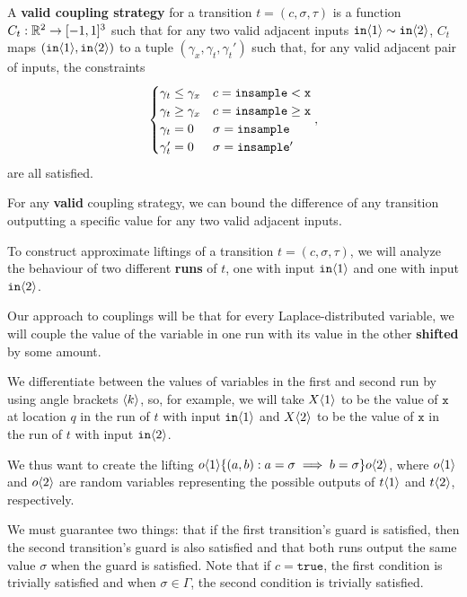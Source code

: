 \begin{defn}
    A \textbf{valid coupling strategy} for a transition $t = (c, \sigma, \tau)$ is a function $C_t:\RR^2\to[-1, 1]^3$ such that for any two valid adjacent inputs $\texttt{in}\brangle{1}\sim\texttt{in}\brangle{2}$, $C_t$ maps $(\texttt{in}\brangle{1},\texttt{in}\brangle{2})$ to a tuple $(\gamma_x, \gamma_t, \gamma_t')$ such that, for any valid adjacent pair of inputs, the constraints \[
        \begin{cases}
          \gamma_t\leq\gamma_x & c = \lguard[\texttt{x}]\\
          \gamma_t\geq\gamma_x & c = \gguard[\texttt{x}]\\
          \gamma_t=0 & \sigma = \texttt{insample}\\
          \gamma_t'=0 & \sigma = \texttt{insample}'
        \end{cases},
      \]
      are all satisfied. 
\end{defn}

For any \textbf{valid} coupling strategy, we can bound the difference of any transition outputting a specific value for any two valid adjacent inputs. 

To construct approximate liftings of a transition $t = (c, \sigma, \tau)$, we will analyze the behaviour of two different \textbf{runs} of $t$, one with input $\texttt{in}\brangle{1}$ and one with input $\texttt{in}\brangle{2}$. 

Our approach to couplings will be that for every Laplace-distributed variable, we will couple the value of the variable in one run with its value in the other \textbf{shifted} by some amount. 

We differentiate between the values of variables in the first and second run by using angle brackets $\brangle{k}$, so, for example, we will take $X\brangle{1}$ to be the value of $\texttt{x}$ at location $q$ in the run of $t$ with input $\texttt{in}\brangle{1}$ and $X\brangle{2}$ to be the value of $\texttt{x}$ in the run of $t$ with input $\texttt{in}\brangle{2}$. 

We thus want to create the lifting $o\brangle{1}\{(a, b): a=\sigma\implies b=\sigma\}o\brangle{2}$, where $o\brangle{1}$ and $o\brangle{2}$ are random variables representing the possible outputs of $t\brangle{1}$ and $t\brangle{2}$, respectively.

We must guarantee two things: that if the first transition's guard is satisfied, then the second transition's guard is also satisfied and that both runs output the same value $\sigma$ when the guard is satisfied. Note that if $c = \texttt{true}$, the first condition is trivially satisfied and when $\sigma\in \Gamma$, the second condition is trivially satisfied. 

